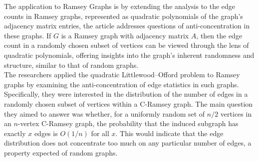 The application to Ramsey Graphs is by extending the analysis to the edge counts in Ramsey graphs, represented as quadratic polynomials of the graph's adjacency matrix entries, the article addresses questions of anti-concentration in these graphs. If ${G}$ is a Ramsey graph with adjacency matrix ${A}$, then the edge count in a randomly chosen subset of vertices can be viewed through the lens of quadratic polynomials, offering insights into the graph's inherent randomness and structure, similar to that of random graphs.\\
The researchers applied the quadratic Littlewood–Offord problem to Ramsey graphs by examining the anti-concentration of edge statistics in such graphs. Specifically, they were interested in the distribution of the number of edges in a randomly chosen subset of vertices within a C-Ramsey graph. The main question they aimed to answer was whether, for a uniformly random set of ${n/2}$ vertices in an ${n}$-vertex C-Ramsey graph, the probability that the induced subgraph has exactly ${x}$ edges is ${O(1/n)}$ for all ${x}$. This would indicate that the edge distribution does not concentrate too much on any particular number of edges, a property expected of random graphs.
